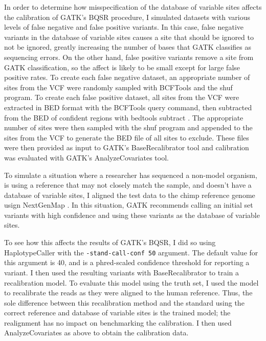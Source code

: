 In order to determine how misspecification of the database of variable sites affects the calibration of GATK's BQSR procedure, I simulated datasets with various levels of false negative and false positive variants. In this case, false negative variants in the database of variable sites causes a site that should be ignored to not be ignored, greatly increasing the number of bases that GATK classifies as sequencing errors. On the other hand, false positive variants remove a site from GATK classification, so the affect is likely to be small except for large false positive rates. To create each false negative dataset, an appropriate number of sites from the VCF were randomly sampled with BCFTools and the shuf program. To create each false positive dataset, all sites from the VCF were extracted in BED format with the BCFTools query command, then subtracted from the BED of confident regions with bedtools subtract \parencite{quinlan_bedtools_2010}. The appropriate number of sites were then sampled with the shuf program and appended to the sites from the VCF to generate the BED file of all sites to exclude. These files were then provided as input to GATK's BaseRecalibrator tool and calibration was evaluated with GATK's AnalyzeCovariates tool.

To simulate a situation where a researcher has sequenced a non-model organism, is using a reference that may not closely match the sample, and doesn't have a database of variable sites, I aligned the test data to the chimp reference genome \parencite{waterson_initial_2005} usign NextGenMap \parencite{sedlazeck_nextgenmap_2013}. %
In this situation, GATK recommends calling an initial set variants with high confidence and using these variants as the database of variable sites. %

To see how this affects the results of GATK's BQSR, I did so using HaplotypeCaller with the \texttt{-stand-call-conf 50} argument. The default value for this argument is 40, and is a phred-scaled confidence threshold for reporting a variant. I then used the resulting variants with BaseRecalibrator to train a recalibration model. To evaluate this model using the truth set, I used the model to recalibrate the reads as they were aligned to the human reference. Thus, the sole difference between this recalibration method and the standard using the correct reference and database of variable sites is the trained model; the realignment has no impact on benchmarking the calibration. I then used AnalyzeCovariates as above to obtain the calibration data.

